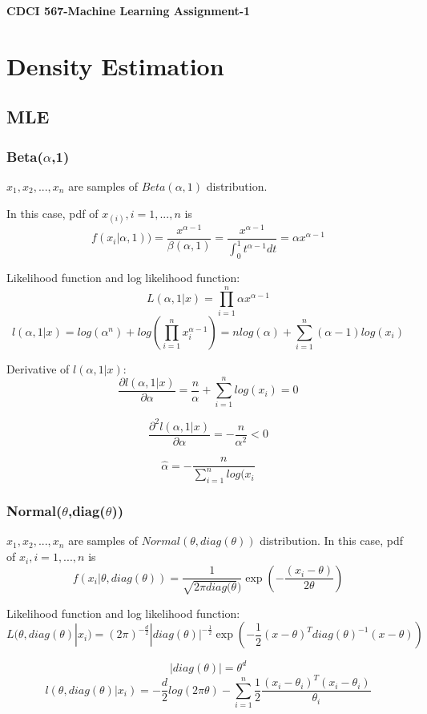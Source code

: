 \documentclass[letter,11pt]{article}
\begin{document}
	\begin{center}
		\Large\textbf{CDCI 567-Machine Learning Assignment-1}
	\end{center}
	
	\section{Density Estimation}
	\subsection{MLE}
	\subsubsection{Beta($\alpha$,1)}
	$x_{1},x_{2},...,x_{n}$ are samples of $Beta(\alpha,1)$ distribution.
	
	In this case, pdf of $x_(i), i=1,...,n$ is $$f(x_{i}|\alpha,1))=\frac{x^{\alpha-1}}{\beta(\alpha,1)}=
	\frac{x^{\alpha-1}}{\int_{0}^{1}t^{\alpha-1}dt}=
	\alpha x^{\alpha-1}$$
	
	Likelihood function and log likelihood function:
	$$L(\alpha,1|x)=\prod_{i=1}^{n}\alpha x^{\alpha-1}$$
	$$l(\alpha,1|x)=log(\alpha^{n}) + log(\prod_{i=1}^{n}x_{i}^{\alpha-1})=
	nlog(\alpha) + \sum_{i=1}^{n}(\alpha-1)log(x_{i})$$
	
	Derivative of $l(\alpha,1|x)$:
	$$\frac{\partial l(\alpha,1|x)}{\partial \alpha} = \frac{n}{\alpha} + \sum_{i=1}^{n}log(x_{i})=0$$
	
	$$\frac{\partial^{2} l(\alpha,1|x)}{\partial \alpha} = -\frac{n}{\alpha^{2}} < 0$$
	
	$$\hat{\alpha} = -\frac{n}{\sum_{i=1}^{n}log(x_{i}}$$
	\subsubsection{Normal($\theta$,diag($\theta$))}
	$x_{1},x_{2},...,x_{n}$ are samples of $Normal(\theta,diag(\theta))$ distribution.
	In this case, pdf of $x_{i}, i = 1,...,n$ is
	$$f(x_{i}|\theta,diag(\theta)) = \frac{1}{\sqrt{2\pi diag(\theta})}\exp(-\frac{(x_{i}-\theta)}{2\theta})$$
	
	Likelihood function and log likelihood function:
	$$L(\theta,diag(\theta)|x_{i}) = (2\pi)^{-\frac{d}{2}}|diag(\theta)|^{-\frac{1}{2}}\exp(-\frac{1}{2}(x-\theta)^{T}diag(\theta)^{-1}(x-\theta))$$	
	
	$$|diag(\theta)| = \theta^{d}$$
	$$l(\theta,diag(\theta)|x_{i}) = -\frac{d}{2}log(2\pi\theta) - \sum_{i=1}^{n}\frac{1}{2} \frac{(x_{i}-\theta_{i})^{T}(x_{i}-\theta_{i})}{\theta_{i}}$$
	
\end{document}
